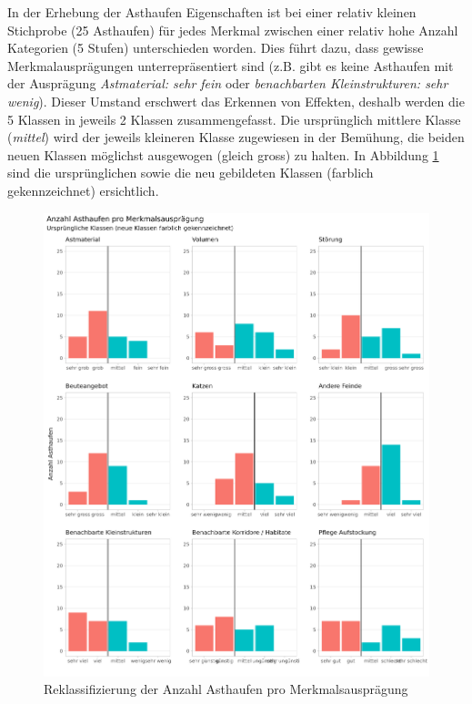 \documentclass[
  oneside]{scrbook}
\begin{document}
In der Erhebung der Asthaufen Eigenschaften ist bei einer relativ kleinen Stichprobe (25 Asthaufen) für jedes Merkmal zwischen einer relativ hohe Anzahl Kategorien (5 Stufen) unterschieden worden. Dies führt dazu, dass gewisse Merkmalausprägungen unterrepräsentiert sind (z.B. gibt es keine Asthaufen mit der Ausprägung \emph{Astmaterial: sehr fein} oder \emph{benachbarten Kleinstrukturen: sehr wenig}). Dieser Umstand erschwert das Erkennen von Effekten, deshalb werden die 5 Klassen in jeweils 2 Klassen zusammengefasst. Die ursprünglich mittlere Klasse (\emph{mittel}) wird der jeweils kleineren Klasse zugewiesen in der Bemühung, die beiden neuen Klassen möglichst ausgewogen (gleich gross) zu halten. In Abbildung \ref{fig:asthaufenqualcount} sind die ursprünglichen sowie die neu gebildeten Klassen (farblich gekennzeichnet) ersichtlich.

\begin{figure}
\includegraphics[width=41in]{images/asthaufen_qualitaet_histogramm} \caption{Reklassifizierung der Anzahl Asthaufen pro Merkmalsausprägung}\label{fig:asthaufenqualcount}
\end{figure}
\end{document}
